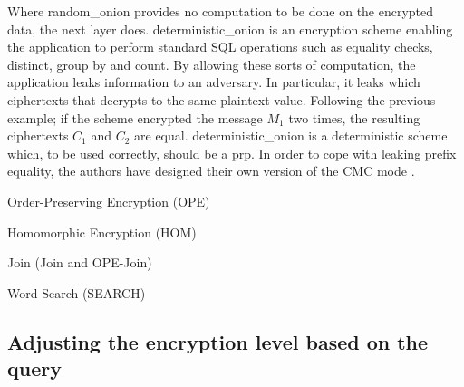 Where \Gls{random_onion} provides no computation to be done on the encrypted data, the next layer does. \Gls{deterministic_onion} is an encryption scheme enabling the application to perform standard SQL operations such as equality checks, distinct, group by and count. By allowing these sorts of computation, the application leaks information to an adversary. In particular, it leaks which ciphertexts that decrypts to the same plaintext value. Following the previous example; if the scheme encrypted the message $M_1$ two times, the resulting ciphertexts $C_1$ and $C_2$ are equal. \Gls{deterministic_onion} is a deterministic scheme which, to be used correctly, should be a \Gls{prp}. In order to cope with leaking prefix equality, the authors have designed their own version of the CMC mode \cite{CryptDB_Main_Paper}.






Order-Preserving Encryption (OPE)


Homomorphic Encryption (HOM)


Join (Join and OPE-Join)


Word Search (SEARCH)


\subsection{Adjusting the encryption level based on the query}

